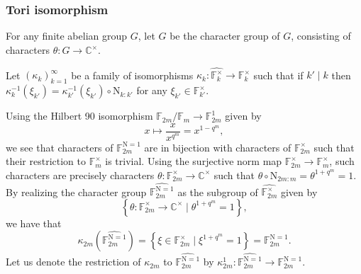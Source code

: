 \documentclass[12pt, reqno]{amsart}
\theoremstyle{definition}
\theoremstyle{definition}
\theoremstyle{definition}
\newcommand{\cComplex}{\mathbb{C}}
\newcommand{\multiplicativegroup}[1]{#1^{\times}}
\newcommand{\FieldNorm}[2]{\mathrm{N}_{#1:#2}}
\newcommand{\aFieldNorm}{\mathrm{N}}
\newcommand{\finiteField}{\mathbb{F}}
\newcommand{\finiteFieldExtension}[1]{\finiteField_{#1}}
\newcommand{\NormOneGroup}[1]{\finiteFieldExtension{#1}^{\aFieldNorm = 1}}
\newcommand{\charactergroup}[1]{\widehat{\multiplicativegroup{\finiteFieldExtension{#1}}}}
\newcommand{\ToriDualToriIsomorphism}{\kappa}
\begin{document}
\subsubsection{Tori isomorphism}\label{subsec:tori-isomorphism}

For any finite abelian group $G$, let $\widehat{G}$ be the character group of $G$, consisting of characters $\theta \colon G \to \multiplicativegroup{\cComplex}$.

Let $\left(\ToriDualToriIsomorphism_k\right)_{k=1}^{\infty}$ be a family of isomorphisms $\ToriDualToriIsomorphism_k \colon \charactergroup{k} \to \multiplicativegroup{\finiteFieldExtension{k}}$ such that if $k' \mid k$ then $\ToriDualToriIsomorphism_k^{-1}\left(\xi_{k'}\right) = \ToriDualToriIsomorphism_{k'}^{-1}\left(\xi_{k'}\right) \circ \FieldNorm{k}{k'}$ for any $\xi_{k'} \in \multiplicativegroup{\finiteFieldExtension{k'}}$.

Using the Hilbert 90 isomorphism $\finiteFieldExtension{2m} \slash \finiteFieldExtension{m} \to \finiteFieldExtension{2m}^{1}$ given by $$x \mapsto \frac{x}{x^{q^m}} = x^{1 - q^m},$$ we see that characters of $\NormOneGroup{2m}$ are in bijection with characters of $\multiplicativegroup{\finiteFieldExtension{2m}}$ such that their restriction to $\multiplicativegroup{\finiteFieldExtension{m}}$ is trivial. Using the surjective norm map $\multiplicativegroup{\finiteFieldExtension{2m}} \to \multiplicativegroup{\finiteFieldExtension{m}}$, such characters are precisely characters $\theta \colon \multiplicativegroup{\finiteFieldExtension{2m}} \to \multiplicativegroup{\cComplex}$ such that $\theta \circ \FieldNorm{2m}{m} = \theta^{1 + q^m} = 1$. By realizing the character group $\widehat{\NormOneGroup{2m}}$ as the subgroup of $\charactergroup{2m}$ given by $$\left\{ \theta \colon \multiplicativegroup{\finiteFieldExtension{2m}} \to \multiplicativegroup{\cComplex} \mid \theta^{1+q^m} = 1\right\},$$
we have that $$\ToriDualToriIsomorphism_{2m}\left(\widehat{\NormOneGroup{2m}}\right) = \left\{\xi \in \multiplicativegroup{\finiteFieldExtension{2m}} \mid \xi^{1+q^m} = 1\right\} = \NormOneGroup{2m}.$$
Let us denote the restriction of $\ToriDualToriIsomorphism_{2m}$ to $\widehat{\NormOneGroup{2m}}$ by $\ToriDualToriIsomorphism_{2m}^1 \colon \widehat{\NormOneGroup{2m}} \to \NormOneGroup{2m}$.
\end{document}
